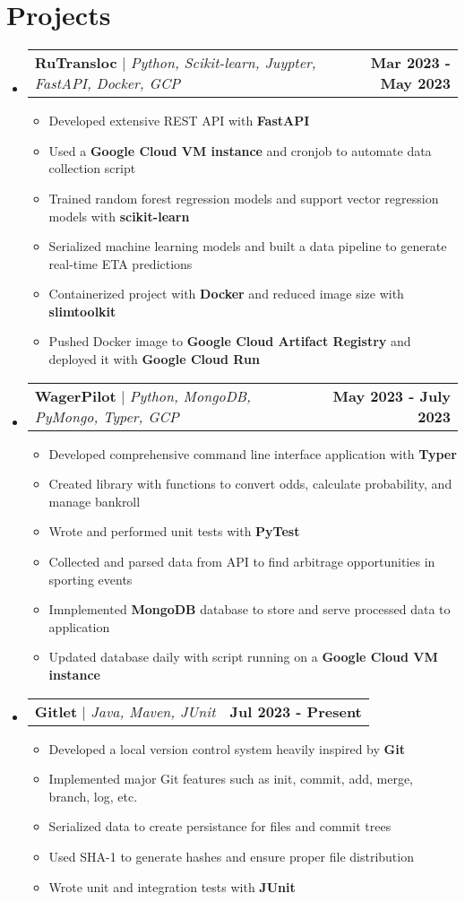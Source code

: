 \documentclass[letterpaper,11pt]{article}
\makeatletter
\newcommand{\resumeItem}[1]{
  \item\small{
    {#1 \vspace{-2pt}}
  }
}
\newcommand{\resumeProjectHeading}[2]{
    \item
    \begin{tabular*}{0.97\textwidth}{l@{\extracolsep{\fill}}r}
      \small#1 & #2 \\
    \end{tabular*}\vspace{-7pt}
}
\newcommand{\resumeSubHeadingListStart}{\begin{itemize}[leftmargin=0.15in, label={}]}
\newcommand{\resumeSubHeadingListEnd}{\end{itemize}}
\newcommand{\resumeItemListStart}{\begin{itemize}}
\newcommand{\resumeItemListEnd}{\end{itemize}\vspace{-3pt}}
\makeatother
\begin{document}
\section{Projects}
    \resumeSubHeadingListStart
      \resumeProjectHeading
          {\textbf{RuTransloc} $|$ \emph{Python, Scikit-learn, Juypter, FastAPI, Docker, GCP}}{\textbf{Mar 2023 - May 2023}}
          \resumeItemListStart
            \resumeItem{Developed extensive REST API with \textbf{FastAPI}}
            \resumeItem{Used a \textbf{Google Cloud VM instance} and cronjob to automate data collection script}
            \resumeItem{Trained random forest regression models and support vector regression models with \textbf{scikit-learn}}
            \resumeItem{Serialized machine learning models and built a data pipeline to generate real-time ETA predictions}
            \resumeItem{Containerized project with \textbf{Docker} and reduced image size with \textbf{slimtoolkit}}
            \resumeItem{Pushed Docker image to \textbf{Google Cloud Artifact Registry} and deployed it with \textbf{Google Cloud Run}}
          \resumeItemListEnd
      \resumeProjectHeading
          {\textbf{WagerPilot} $|$ \emph{Python, MongoDB, PyMongo, Typer, GCP}}{\textbf{May 2023 - July 2023}}
          \resumeItemListStart
            \resumeItem{Developed comprehensive command line interface application with \textbf{Typer}}
            \resumeItem{Created library with functions to convert odds, calculate probability, and manage bankroll}
            \resumeItem{Wrote and performed unit tests with \textbf{PyTest}}
            \resumeItem{Collected and parsed data from API to find arbitrage opportunities in sporting events}
            \resumeItem{Imnplemented \textbf{MongoDB} database to store and serve processed data to application}
            \resumeItem{Updated database daily with script running on a \textbf{Google Cloud VM instance}}
          \resumeItemListEnd
      \resumeProjectHeading
          {\textbf{Gitlet} $|$ \emph{Java, Maven, JUnit}}{\textbf{Jul 2023 - Present}}
          \resumeItemListStart
            \resumeItem{Developed a local version control system heavily inspired by \textbf{Git}}
            \resumeItem{Implemented major Git features such as init, commit, add, merge, branch, log, etc.}
            \resumeItem{Serialized data to create persistance for files and commit trees}
            \resumeItem{Used SHA-1 to generate hashes and ensure proper file distribution}
            \resumeItem{Wrote unit and integration tests with \textbf{JUnit}}
          \resumeItemListEnd
    \resumeSubHeadingListEnd
\end{document}
